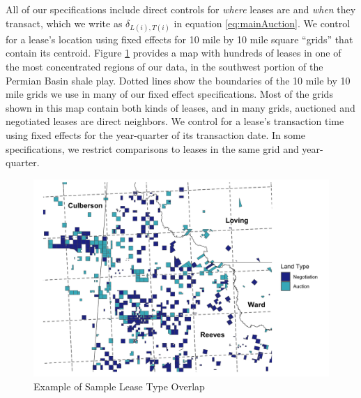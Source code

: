 All of our specifications include direct controls for \textit{where} leases are and \textit{when} they transact, which we write as $\delta_{L(i),T(i)}$ in equation \ref{eq:mainAuction}. We control for a lease's location using fixed effects for 10 mile by 10 mile square ``grids'' that contain its centroid. Figure \ref{fig:RAL_overlap_map} provides a map with hundreds of leases in one of the most concentrated regions of our data, in the southwest portion of the Permian Basin shale play.  Dotted lines show the boundaries of the 10 mile by 10 mile grids we use in many of our fixed effect specifications. Most of the grids shown in this map contain both kinds of leases, and in many grids, auctioned and negotiated leases are direct neighbors. We control for a lease's transaction time using fixed effects for the year-quarter of its transaction date. In some specifications, we restrict comparisons to leases in the same grid and year-quarter. 

\begin{figure}
	\begin{centering}
	\caption{Example of Sample Lease Type Overlap \label{fig:RAL_overlap_map}}
	\includegraphics[width=.9\textwidth]{../output/figures/sample_glo_leases.png}
	\par\end{centering}
\end{figure}

